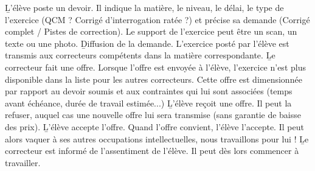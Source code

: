 \begin{enumerate}
\li \b{L'élève poste un devoir}. Il indique la matière, le niveau, le délai, le type de l'exercice (QCM ? Corrigé d'interrogation ratée ?) et précise sa demande (Corrigé complet / Pistes de correction). Le support de l'exercice peut être un scan, un texte ou une photo.
\li \b{Diffusion de la demande}. L'exercice posté par l'élève est transmis aux correcteurs compétents dans la matière correspondante.
\li \b{Le correcteur fait une offre}.  Lorsque l'offre est envoyée à l'élève, l'exercice n'est plus disponible dans la liste pour les autres correcteurs. Cette offre est dimensionnée par rapport au devoir soumis et aux contraintes qui lui sont associées (temps avant échéance, durée de travail estimée...)
\li \b{L'élève reçoit une offre}. Il peut la refuser, auquel cas une nouvelle offre lui sera transmise (sans garantie de baisse des prix).
\li \b{L'élève accepte l'offre}. Quand l'offre convient, l'élève l'accepte. Il peut alors vaquer à ses autres occupations intellectuelles, nous travaillons pour lui !
\li \b{Le correcteur est informé de l'assentiment de l'élève}. Il peut dès lors commencer à travailler.
\end{enumerate}